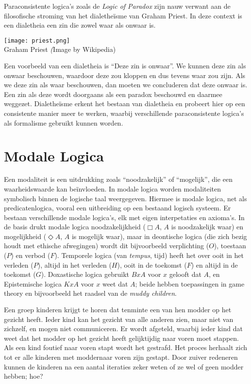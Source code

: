 \begin{aside}
  Paraconsistente logica's zoals de \emph{Logic of Paradox} zijn nauw verwant aan de filosofische stroming van het dialethe\"isme van Graham Priest. In deze context is een dialetheia een zin die zowel waar als onwaar is.
  \begin{marginfigure}
\texttt{[image: priest.png]}\\
    Graham Priest {\scriptsize\emph (Image by Wikipedia)}\\[3mm]
  \end{marginfigure}
Een voorbeeld van een dialetheia is \enquote{Deze zin is onwaar}. We kunnen deze zin als onwaar beschouwen, waardoor deze zou kloppen en dus tevens waar zou zijn. Als we deze zin als waar beschouwen, dan moeten we concluderen dat deze onwaar is. Een zin als deze wordt doorgaans als een paradox beschouwd en daarmee weggezet. Dialethe\"isme erkent het bestaan van dialetheia en probeert hier op een consistente manier meer te werken, waarbij verschillende paraconsistente logica's als formalisme gebruikt kunnen worden.
\end{aside}

\section{Modale Logica}\label{sec:modal}
Een modaliteit is een uitdrukking zoals \enquote{noodzakelijk} of \enquote{mogelijk}, die een waarheidswaarde kan be\"invloeden. In modale logica worden modaliteiten symbolisch binnen de logische taal weergegeven. Hiermee is modale logica, net als predicatenlogica, vooral een uitbreiding op een bestaand logisch systeem. Er bestaan verschillende modale logica's, elk met eigen interpetaties en axioma's. In de basis drukt modale logica noodzakelijkheid ($\Box A$, $A$ is noodzakelijk waar) en mogelijkheid ($\Diamond A$, $A$ is mogelijk waar), maar in deontische logica (die zich bezig houdt met ethische afwegingen) wordt dit bijvoorbeeld verplichting ($O$), toestaan ($P$) en verbod ($F$). Temporele logica (van \emph{tempus}, tijd) heeft het over ooit in het verleden ($P$), altijd in het verleden ($H$), ooit in de toekomst ($F$) en altijd in de toekomst ($G$). Doxastische logica gebruikt $BxA$ voor $x$ gelooft dat $A$, en Epistemische logica $KxA$ voor $x$ weet dat $A$; beide hebben toepassingen in game theory en bijvoorbeeld het raadsel van de \emph{muddy children}.

\begin{aside}
  Een groep kinderen krijgt te horen dat tenminte een van hen modder op het gezicht heeft. Ieder kind kan het gezicht van alle anderen zien, maar niet van zichzelf, en mogen niet communiceren. Er wordt afgeteld, waarbij ieder kind dat weet dat het modder op het gezicht heeft gelijktijdig naar voren moet stappen. Als een kind foutief naar voren stapt wordt het gestrafd. Het proces herhaalt zich tot er alle kinderen met moddernaar voren zijn gestapt. Door zuiver redeneren kunnen de kinderen na een aantal iteraties zeker weten of ze wel of geen modder hebben; hoe?
\end{aside}

